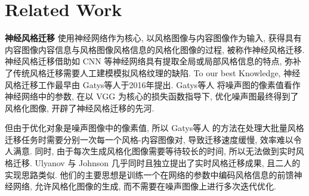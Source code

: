 \section{Related Work}

\textbf{神经风格迁移} 使用神经网络作为核心, 以风格图像与内容图像作为输入, 获得具有内容图像内容信息与风格图像风格信息的风格化图像的过程, 被称作神经风格迁移. 神经风格迁移借助如 CNN\cite{tammina2019transfer} 等神经网络具有提取全局或局部风格信息的特点, 弥补了传统风格迁移需要人工建模模拟风格纹理的缺陷. To our best Knowledge, 神经风格迁移工作最早由 Gatys等人于2016年\cite{gatys2016image}提出. Gatys等人\cite{gatys2016image} 将噪声图的像素值看作神经网络中的参数, 在以 VGG\cite{simonyan2014very} 为核心的损失函数指导下, 优化噪声图最终得到了风格化图像, 开辟了神经风格迁移的先河. 

但由于优化对象是噪声图像中的像素值, 所以 Gatys等人\cite{gatys2016image} 的方法在处理大批量风格迁移任务时需要分别一次每一个风格-内容图像对, 导致迁移速度缓慢, 效率难以令人满意. 同时, 由于每次生成风格化图像需要等待较长的时间, 所以无法做到实时风格迁移. Ulyanov\cite{ulyanov2016texture} 与 Johnson\cite{johnson2016perceptual} 几乎同时且独立提出了实时风格迁移成果, 且二人的实现思路类似. 他们的主要思想是训练一个在网络的参数中编码风格信息的前馈神经网络, 允许风格化图像的生成, 而不需要在噪声图像上进行多次迭代优化. 